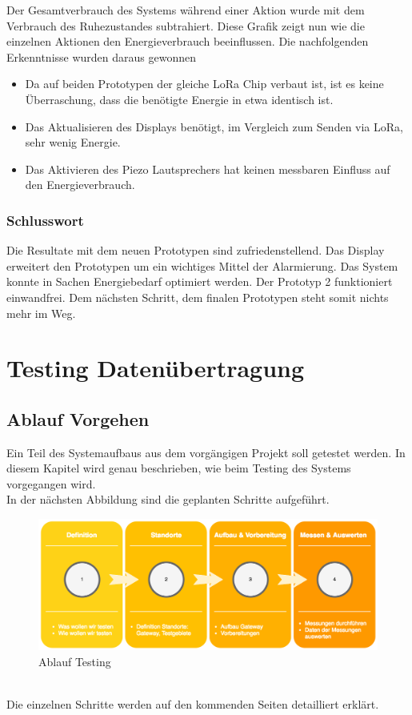 \documentclass[11pt,english,german]{report}
\theoremstyle{definition}
\begin{document}
\noindent
Der Gesamtverbrauch des Systems während einer Aktion wurde mit dem Verbrauch des Ruhezustandes subtrahiert. Diese Grafik zeigt nun wie die einzelnen Aktionen den Energieverbrauch beeinflussen. Die nachfolgenden Erkenntnisse wurden daraus gewonnen
\begin{itemize}
\item Da auf beiden Prototypen der gleiche LoRa Chip verbaut ist, ist es keine Überraschung, dass die benötigte Energie in etwa identisch ist. 
\item Das Aktualisieren des Displays benötigt, im Vergleich zum Senden via LoRa,  sehr wenig Energie.
\item Das Aktivieren des Piezo Lautsprechers hat keinen messbaren Einfluss auf den Energieverbrauch.
\end{itemize}

\newpage
\subsection{Schlusswort}
Die Resultate mit dem neuen Prototypen sind zufriedenstellend. Das Display erweitert den Prototypen um ein wichtiges Mittel der Alarmierung. Das System konnte in Sachen Energiebedarf optimiert werden. Der Prototyp 2 funktioniert einwandfrei. Dem nächsten Schritt, dem finalen Prototypen steht somit nichts mehr im Weg.


\chapter{Testing Datenübertragung }
\section{Ablauf Vorgehen}
Ein Teil des Systemaufbaus aus dem vorgängigen Projekt soll getestet werden. In diesem Kapitel wird genau beschrieben, wie beim Testing des Systems vorgegangen wird.\\[0.3cm]
In der nächsten Abbildung sind die geplanten Schritte aufgeführt.
\begin{figure}[h]
	\centering
	\includegraphics[width=\textwidth]{img/projectFlow_testing.png}
	\caption[Flowchart Testing]
	{Ablauf Testing}
\end{figure}
\\ 
Die einzelnen Schritte werden auf den kommenden Seiten detailliert erklärt.
\newpage
\end{document}
